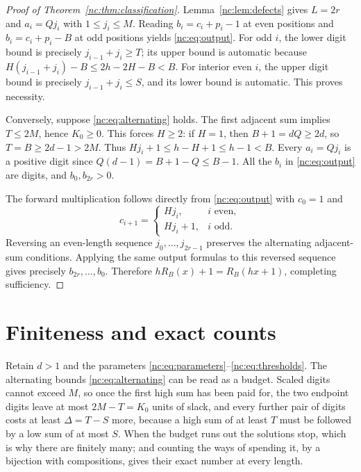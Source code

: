 \documentclass[11pt]{amsart}
\theoremstyle{remark}\newtheorem{remark}[theorem]{Remark}
\begin{document}
\begin{proof}[Proof of Theorem~\ref{nc:thm:classification}]
Lemma~\ref{nc:lem:defects} gives $L=2r$ and $a_i=Qj_i$ with $1\le j_i\le M$. Reading $b_i=c_i+p_i-1$ at even positions and $b_i=c_i+p_i-B$ at odd positions yields \eqref{nc:eq:output}. For odd $i$, the lower digit bound is precisely $j_{i-1}+j_i\ge T$; its upper bound is automatic because $H(j_{i-1}+j_i)-B\le2h-2H-B<B$. For interior even $i$, the upper digit bound is precisely $j_{i-1}+j_i\le S$, and its lower bound is automatic. This proves necessity.

Conversely, suppose \eqref{nc:eq:alternating} holds. The first adjacent sum implies $T\le2M$, hence $K_0\ge0$. This forces $H\ge2$: if $H=1$, then $B+1=dQ\ge2d$, so $T=B\ge2d-1>2M$. Thus $Hj_i+1\le h-H+1\le h-1<B$. Every $a_i=Qj_i$ is a positive digit since $Q(d-1)=B+1-Q\le B-1$. All the $b_i$ in \eqref{nc:eq:output} are digits, and $b_0,b_{2r}>0$.

The forward multiplication follows directly from \eqref{nc:eq:output} with $c_0=1$ and
\[
 c_{i+1}=\begin{cases}Hj_i,&i\text{ even},\\Hj_i+1,&i\text{ odd}.
 \end{cases}
\]
Reversing an even-length sequence $j_0,\ldots,j_{2r-1}$ preserves the alternating adjacent-sum conditions. Applying the same output formulas to this reversed sequence gives precisely $b_{2r},\ldots,b_0$. Therefore $hR_B(x)+1=R_B(hx+1)$, completing sufficiency.
\end{proof}

\section{Finiteness and exact counts}\label{sec:enumeration}

Retain $d>1$ and the parameters \eqref{nc:eq:parameters}--\eqref{nc:eq:thresholds}. The alternating bounds \eqref{nc:eq:alternating} can be read as a budget. Scaled digits cannot exceed $M$, so once the first high sum has been paid for, the two endpoint digits leave at most $2M-T=K_0$ units of slack, and every further pair of digits costs at least $\Delta=T-S$ more, because a high sum of at least $T$ must be followed by a low sum of at most $S$. When the budget runs out the solutions stop, which is why there are finitely many; and counting the ways of spending it, by a bijection with compositions, gives their exact number at every length.
\end{document}
